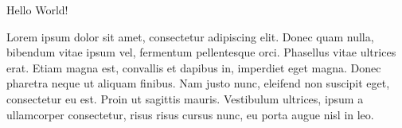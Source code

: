 \documentclass{article}
\begin{document}
Hello World!

Lorem ipsum dolor sit amet, consectetur adipiscing elit. Donec quam
nulla, bibendum vitae ipsum vel, fermentum pellentesque orci.
Phasellus vitae ultrices erat. Etiam magna est, convallis et dapibus
in, imperdiet eget magna. Donec pharetra neque ut aliquam finibus. Nam
justo nunc, eleifend non suscipit eget, consectetur eu est. Proin ut
sagittis mauris. Vestibulum ultrices, ipsum a ullamcorper consectetur,
risus risus cursus nunc, eu porta augue nisl in leo.
\end{document}
